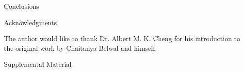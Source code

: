 \documentclass{article}
\begin{document}
\begin{section}{Conclusions}
\end{section}

\begin{section}{Acknowledgments}
  \begin{paragraph}{}
    The author would like to thank Dr. Albert M. K. Cheng for his introduction to the original work by Chaitanya Belwal and himself.
  \end{paragraph}
\end{section}

\printbibliography

\begin{section}{Supplemental Material}
\end{section}
\end{document}
